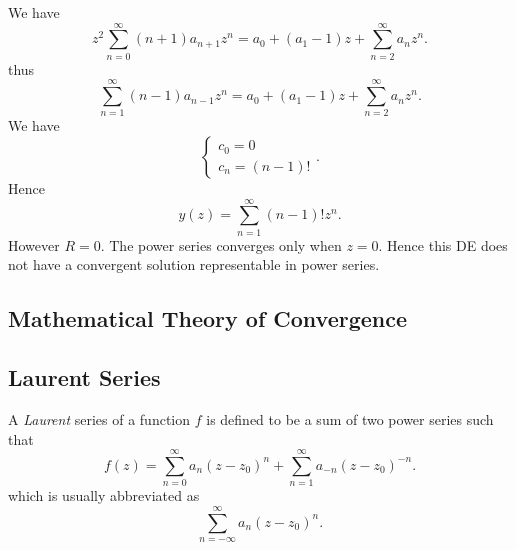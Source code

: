 \begin{enumerate}
\begin{example}
		We have
		\[
			z^2 \sum_{n=0}^{\infty} (n+1)a_{n+1}z^n = a_0 + (a_1-1)z + \sum_{n=2}^{\infty} a_n z^n
		.\] 
		thus
\[
			\sum_{n=1}^{\infty} (n-1)a_{n-1}z^n = a_0 + (a_1-1)z + \sum_{n=2}^{\infty} a_n z^n
		.\]
		We have
		\[
			\begin{cases}
				c_0 =0 \\
				c_n = (n-1)!
			\end{cases}
		.\] 
		Hence
		\[
			y(z) = \sum_{n=1}^{\infty} (n-1)! z^n
		.\] 
		However $R = 0$. The power series converges only when $z=0$. Hence this DE does not have a convergent solution representable in power series.
	\end{example}

\end{enumerate}



\subsection{Mathematical Theory of Convergence}




\subsection{Laurent Series}

\begin{definition}
	A \textit{Laurent} series of a function $f$ is defined to be a sum of two power series such that
	\[
		f(z) = \sum_{n=0}^{\infty} a_n (z-z_0)^n + \sum_{n=1}^{\infty} a_{-n} (z-z_0)^{-n}
	.\] 
	which is usually abbreviated as
	\[
		\sum_{n=-\infty }^{\infty} a_n (z-z_0)^n
	.\] 
\end{definition}

